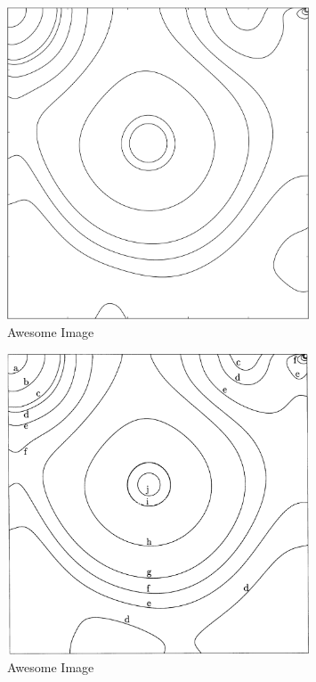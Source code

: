 \begin{figure}[p]
    \centering
    \includegraphics[width=0.8\textwidth]{Images/pressure.pdf}
    \caption{Awesome Image}
    \label{fig:awesome_image}
\end{figure}

\begin{figure}[p]
    \centering
    \includegraphics[width=0.8\textwidth]{Images/pressure.png}
    \caption{Awesome Image}
    \label{fig:awesome_image}
\end{figure}